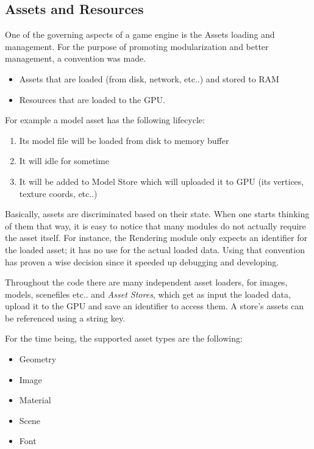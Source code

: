 \subsection{Assets and Resources}
One of the governing aspects of a game engine is the Assets loading and management. For the
purpose of promoting modularization and better management, a convention was made.

\begin{itemize}
\item Assets that are loaded (from disk, network, etc..) and stored to RAM
\item Resources that are loaded to the GPU\@.
\end{itemize}

\noindent For example a model asset has the following lifecycle:

\begin{enumerate}
\item Its model file will be loaded from disk to memory buffer
\item It will idle for sometime
\item It will be added to Model Store which will uploaded it to GPU (its vertices, texture coords,
      etc..)
\end{enumerate}

Basically, assets are discriminated based on their state. When one starts thinking of them that
way, it is easy to notice that many modules do not actually require the asset itself. For
instance, the Rendering module only expects an identifier for the loaded asset; it has no use
for the actual loaded data. Using that convention has proven a wise decision since it speeded
up debugging and developing.

Throughout the code there are many independent asset loaders, for images, models, scenefiles etc..
and \textit{Asset Stores}, which get as input the loaded data, upload it to the GPU and save an
identifier to access them. A store's assets can be referenced using a string key.

\noindent For the time being, the supported asset types are the following:

\begin{itemize}
\item Geometry
\item Image
\item Material
\item Scene
\item Font
\end{itemize}

